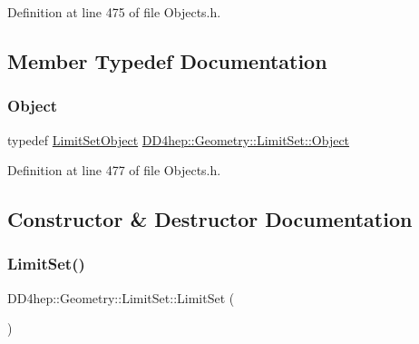 Definition at line 475 of file Objects.\+h.



\subsection{Member Typedef Documentation}
\hypertarget{class_d_d4hep_1_1_geometry_1_1_limit_set_a7fc622c60ba15cb5149d6d2ea21ed42e}{}\label{class_d_d4hep_1_1_geometry_1_1_limit_set_a7fc622c60ba15cb5149d6d2ea21ed42e} 
\subsubsection{\texorpdfstring{Object}{Object}}
{\footnotesize\ttfamily typedef \hyperlink{class_d_d4hep_1_1_geometry_1_1_limit_set_object}{Limit\+Set\+Object} \hyperlink{class_d_d4hep_1_1_geometry_1_1_limit_set_a7fc622c60ba15cb5149d6d2ea21ed42e}{D\+D4hep\+::\+Geometry\+::\+Limit\+Set\+::\+Object}}



Definition at line 477 of file Objects.\+h.



\subsection{Constructor \& Destructor Documentation}
\hypertarget{class_d_d4hep_1_1_geometry_1_1_limit_set_a44077ffb973e104ce5175a1695b2d450}{}\label{class_d_d4hep_1_1_geometry_1_1_limit_set_a44077ffb973e104ce5175a1695b2d450} 
\subsubsection{\texorpdfstring{Limit\+Set()}{LimitSet()}\hspace{0.1cm}{\footnotesize\ttfamily [1/5]}}
{\footnotesize\ttfamily D\+D4hep\+::\+Geometry\+::\+Limit\+Set\+::\+Limit\+Set (\begin{DoxyParamCaption}{ }\end{DoxyParamCaption})\hspace{0.3cm}{\ttfamily [inline]}}



